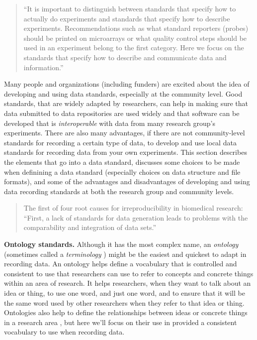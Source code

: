 \documentclass[]{tufte-book}
\begin{document}
\begin{quote}
``It is important to distinguish between standards that specify how to actually
do experiments and standards that specify how to describe experiments.
Recommendations such as what standard reporters (probes) should be printed on
microarrays or what quality control steps should be used in an experiment belong
to the first category. Here we focus on the standards that specify how to
describe and communicate data and information.'' \citep{brazma2006standards}
\end{quote}

Many people and organizations (including funders) are excited about the idea
of developing and using data standards, especially at the community level.
Good standards, that are widely adapted by researchers, can help in making
sure that data submitted to data repositories are used widely and that software
can be developed that is \emph{interoperable} with data from many research group's
experiments. There are also many advantages, if there are not community-level
standards for recording a certain type of data, to develop and use local
data standards for recording data from your own experiments. This section
describes the elements that go into a data standard, discusses some choices
to be made when definining a data standard (especially choices on data
structure and file formats), and some of the advantages and disadvantages
of developing and using data recording standards at both the research group
and community levels.

\begin{quote}
The first of four root causes for irreproducibility in biomedical research: ``First,
a lack of standards for data generation leads to problems with the comparability
and integration of data sets.'' \citep{waltemath2016modeling}
\end{quote}

\textbf{Ontology standards.} Although it has the most complex name, an \emph{ontology}
(sometimes called a \emph{terminology} \citep{sansone2012toward}) might be the easiest and
quickest to adapt in recording data. An ontology helps define a vocabulary that
is controlled and consistent to use that researchers can use to refer to
concepts and concrete things within an area of research. It helps researchers,
when they want to talk about an idea or thing, to use one word, and just one
word, and to ensure that it will be the same word used by other researchers when
they refer to that idea or thing. Ontologies also help to define the relationships
between ideas or concrete things in a research area \citep{ghosh2011software}, but
here we'll focus on their use in provided a consistent vocabulary to use when
recording data.
\end{document}
